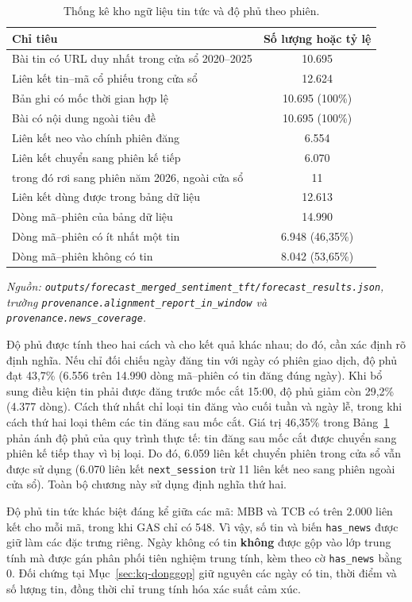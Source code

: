 \documentclass[12pt, a4paper, oneside]{report}
\begin{document}
\begin{table}[H]
  \centering
  \caption{Thống kê kho ngữ liệu tin tức và độ phủ theo phiên.}
  \label{tab:kq-news-stats}
  \begin{tabular}{p{8.4cm} c}
    \toprule
    Chỉ tiêu & Số lượng hoặc tỷ lệ \\
    \midrule
    Bài tin có URL duy nhất trong cửa sổ 2020--2025 & 10.695 \\
    Liên kết tin--mã cổ phiếu trong cửa sổ & 12.624 \\
    Bản ghi có mốc thời gian hợp lệ & 10.695 (100\%) \\
    Bài có nội dung ngoài tiêu đề & 10.695 (100\%) \\
    Liên kết neo vào chính phiên đăng & 6.554 \\
    Liên kết chuyển sang phiên kế tiếp & 6.070 \\
    \quad trong đó rơi sang phiên năm 2026, ngoài cửa sổ & 11 \\
    Liên kết dùng được trong bảng dữ liệu & 12.613 \\
    Dòng mã--phiên của bảng dữ liệu & 14.990 \\
    Dòng mã--phiên có ít nhất một tin & 6.948 (46,35\%) \\
    Dòng mã--phiên không có tin & 8.042 (53,65\%) \\
    \bottomrule
  \end{tabular}
\noindent\textit{Nguồn: \texttt{outputs/forecast\_merged\_sentiment\_tft/forecast\_results.json}, trường \texttt{provenance.alignment\_report\_in\_window} và \texttt{provenance.news\_coverage}.}
\end{table}

Độ phủ được tính theo hai cách và cho kết quả khác nhau; do đó, cần xác định rõ định nghĩa.
Nếu chỉ đối chiếu ngày đăng tin với ngày có phiên giao dịch, độ phủ đạt 43,7\%
(6.556 trên 14.990 dòng mã--phiên có tin đăng đúng ngày). Khi bổ sung điều kiện tin
phải được đăng trước mốc cắt 15:00, độ phủ giảm còn 29,2\% (4.377 dòng). Cách thứ nhất chỉ loại
tin đăng vào cuối tuần và ngày lễ, trong khi cách thứ hai loại thêm các tin đăng sau mốc cắt.
Giá trị 46,35\% trong Bảng~\ref{tab:kq-news-stats} phản ánh độ phủ của quy trình thực tế:
tin đăng sau mốc cắt được chuyển sang phiên kế tiếp thay vì bị loại. Do đó, 6.059 liên kết
chuyển phiên trong cửa sổ vẫn được sử dụng (6.070 liên kết \texttt{next\_session} trừ 11
liên kết neo sang phiên ngoài cửa sổ). Toàn bộ chương này sử dụng định nghĩa thứ hai.

Độ phủ tin tức khác biệt đáng kể giữa các mã: MBB và TCB có trên 2.000 liên kết cho mỗi mã,
trong khi GAS chỉ có 548. Vì vậy, số tin và biến \texttt{has\_news} được giữ làm các đặc trưng
riêng. Ngày không có tin \textbf{không} được gộp vào lớp trung tính mà được gán phân phối tiên
nghiệm trung tính, kèm theo cờ \texttt{has\_news} bằng 0. Đối chứng tại
Mục~\ref{sec:kq-donggop} giữ nguyên các ngày có tin, thời điểm và số lượng tin, đồng thời
chỉ trung tính hóa xác suất cảm xúc.
\end{document}
